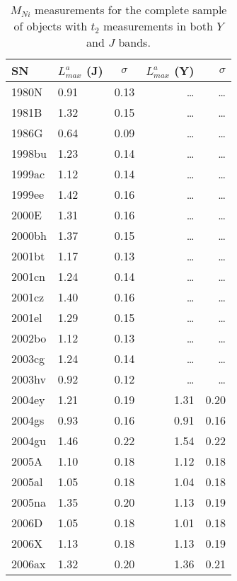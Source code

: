 \begin{table}
\begin{minipage}{70mm}
\begin{center}
\caption{$M_{Ni}$ measurements for the complete sample of objects with $t_2$ measurements in both $Y$ and $J$ bands.}
\begin{tabular}{llcrr}
\hline
SN & $L_{max}^{a}$ (J)	& $\sigma$ & $L_{max}^{a}$ (Y) & $\sigma$ \\
\hline
1980N & 0.91 & 0.13 &\ldots & \ldots \\
1981B & 1.32 & 0.15 &\ldots & \ldots\\
1986G & 0.64 & 0.09 &\ldots & \ldots\\
1998bu & 1.23 & 0.14 &\ldots & \ldots\\
1999ac & 1.12 & 0.14 &\ldots & \ldots\\
1999ee & 1.42 & 0.16 &\ldots & \ldots \\
2000E & 1.31 & 0.16 &\ldots & \ldots\\
2000bh & 1.37 & 0.15 &\ldots & \ldots\\
2001bt & 1.17 & 0.13 &\ldots & \ldots\\
2001cn & 1.24 & 0.14 &\ldots & \ldots\\
2001cz & 1.40 & 0.16 &\ldots & \ldots\\
2001el & 1.29 & 0.15 &\ldots & \ldots\\
2002bo & 1.12 & 0.13 &\ldots & \ldots\\
2003cg & 1.24 & 0.14 &\ldots & \ldots\\
2003hv & 0.92 & 0.12 &\ldots & \ldots \\
2004ey	&	1.21	&	0.19	&	1.31	&	0.20	\\
2004gs	&	0.93	&	0.16	&	0.91	&	0.16	\\
2004gu	&	1.46	&	0.22	&	1.54	&	0.22	\\
2005A	&	1.10	&	0.18	&	1.12	&	0.18	\\
2005al	&	1.05	&	0.18	&	1.04	&	0.18	\\
2005na	&	1.35	&	0.20	&	1.13	&	0.19	\\
2006D	&	1.05	&	0.18	&	1.01	&	0.18	\\
2006X	&	1.13	&	0.18	&	1.13	&	0.19	\\
2006ax	&	1.32	&	0.20	&	1.36	&	0.21	\\


\end{tabular}
\end{center}
\end{minipage}
\end{table}
